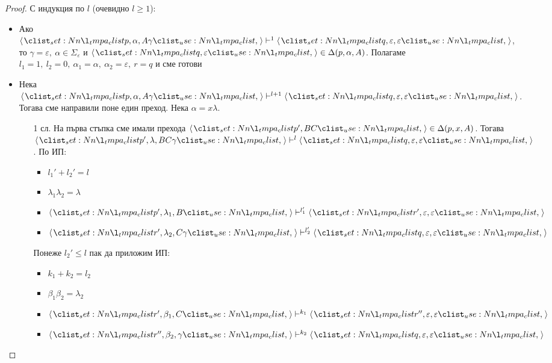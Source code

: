 \begin{proof}
    С индукция по $l$ (очевидно $l \geq 1$):

    \begin{itemize}
        \item Ако $\opair{p, \alpha, A \gamma} \vdash^1 \opair{q, \varepsilon, \varepsilon}$, то $\gamma = \varepsilon, \: \alpha \in \Sigma_{\varepsilon}$ и $\opair{q, \varepsilon} \in \Delta(p, \alpha, A)$.
              Полагаме $l_1 = 1, \: l_2 = 0, \: \alpha_1 = \alpha, \: \alpha_2 = \varepsilon, \: r = q$ и сме готови \checkmark
        \item Нека $\opair{p, \alpha, A \gamma} \vdash^{l + 1} \opair{q, \varepsilon, \varepsilon}$.
              Тогава сме направили поне един преход.
              Нека $\alpha = x \lambda$.

              \begin{itemize}
                  \item[1 сл.] На първа стъпка сме имали прехода $\opair{p', BC} \in \Delta(p, x, A)$.
                      Тогава $\opair{p', \lambda, BC \gamma} \vdash^l \opair{q, \varepsilon, \varepsilon}$.
                      По ИП:

                      \begin{itemize}
                          \item $l_1' + l_2' = l$
                          \item $\lambda_1 \lambda_2 = \lambda$
                          \item $\opair{p', \lambda_1, B} \vdash^{l_1'} \opair{r', \varepsilon, \varepsilon}$
                          \item $\opair{r', \lambda_2, C \gamma} \vdash^{l_2'} \opair{q, \varepsilon, \varepsilon}$
                      \end{itemize}

                      Понеже $l_2' \leq l$ пак да приложим ИП:

                      \begin{itemize}
                          \item $k_1 + k_2 = l_2$
                          \item $\beta_1 \beta_2 = \lambda_2$
                          \item $\opair{r', \beta_1, C} \vdash^{k_1} \opair{r'', \varepsilon, \varepsilon}$
                          \item $\opair{r'', \beta_2, \gamma} \vdash^{k_2} \opair{q, \varepsilon, \varepsilon}$
                      \end{itemize}


\end{itemize}
\end{itemize}
\end{proof}
